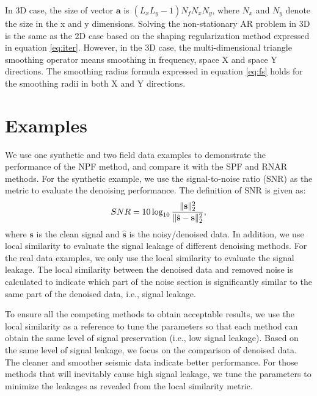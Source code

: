 In 3D case, the size of vector $\mathbf{a}$ is $(L_xL_y-1)N_fN_xN_y$, where $N_x$ and $N_y$ denote the size in the x and y dimensions. Solving the non-stationary AR problem in 3D is the same as the 2D case based on the shaping regularization method expressed in equation \ref{eq:iter}. However, in the 3D case, the multi-dimensional triangle smoothing operator means smoothing in frequency, space X and space Y directions.  The smoothing radius formula expressed in equation \ref{eq:fs} holds for the smoothing radii in both X and Y directions. 

\section{Examples}
We use one synthetic and two field data examples to demonstrate the performance of the NPF method, and compare it with the SPF and RNAR methods. For the synthetic example, we use the signal-to-noise ratio (SNR) as the metric to evaluate the denoising performance. The definition of SNR is given as:
\begin{equation}
\label{eq:diff}
SNR=10\log_{10}\frac{\Arrowvert \mathbf{s} \Arrowvert_2^2}{\Arrowvert \hat{\mathbf{s}} -\mathbf{s}\Arrowvert_2^2},
\end{equation}
where $\mathbf{s}$ is the clean signal and $\hat{\mathbf{s}}$ is the noisy/denoised data. In addition, we use local similarity \cite[]{fomel2007localattr,yangkang2015ortho} to evaluate the signal leakage of different denoising methods. For the real data examples, we only use the local similarity to evaluate the signal leakage. The local similarity between the denoised data and removed noise is calculated to indicate which part of the noise section is significantly similar to the same part of the denoised data, i.e., signal leakage.

To ensure all the competing methods to obtain acceptable results, we use the local similarity as a reference to tune the parameters so that each method can obtain the same level of signal preservation (i.e., low signal leakage). Based on the same level of signal leakage, we focus on the comparison of denoised data. The cleaner and smoother seismic data indicate better performance. For those methods that will inevitably cause high signal leakage, we tune the parameters to minimize the leakages as revealed from the local similarity metric.
 
